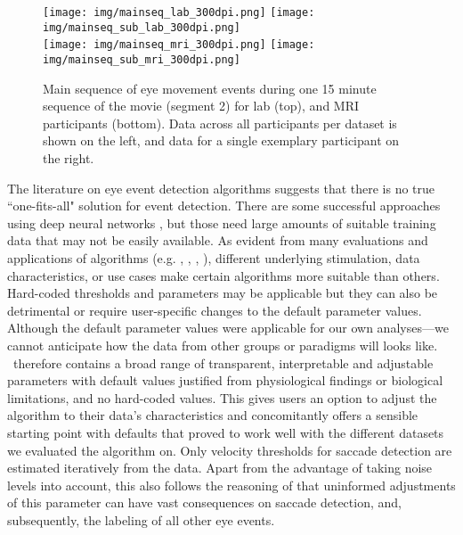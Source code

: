 \begin{figure*}[tbp]
  \texttt{[image: img/mainseq\_lab\_300dpi.png]}
  \texttt{[image: img/mainseq\_sub\_lab\_300dpi.png]} \\
  \texttt{[image: img/mainseq\_mri\_300dpi.png]}
  \texttt{[image: img/mainseq\_sub\_mri\_300dpi.png]}

  \caption{Main sequence of eye movement events during one 15 minute sequence of
  the movie (segment 2) for lab (top), and MRI participants (bottom). Data
  across all participants per dataset is shown on the left, and data for a single
  exemplary participant on the right.}

  \label{fig:overallComp}
\end{figure*}


The literature on eye event detection algorithms suggests that there is no true
``one-fits-all" solution for event detection.  There are some successful
approaches using deep neural networks \citep{Startsev2018}, but those need large amounts of suitable training data that may not be easily
available.
As evident from many evaluations and applications of algorithms (e.g.
\cite{Andersson2017}, \cite{Larsson2013}, \cite{Zemblys2018}, \cite{5523936}),
different underlying stimulation, data characteristics, or use cases make
certain algorithms more suitable than others. Hard-coded thresholds and
parameters may be applicable but they can also be detrimental or require user-specific changes to
the default parameter values. Although the default parameter
values were applicable for our own analyses---we cannot anticipate how the data from other
groups or paradigms will looks like.  \remodnav\ therefore contains a broad range of
transparent, interpretable and adjustable parameters with default values
justified from physiological findings or biological limitations, and no
hard-coded values. This gives users an option to adjust the algorithm to their
data's characteristics and concomitantly offers a sensible starting point with defaults that
proved to work well with the different datasets we evaluated the algorithm on.
Only velocity thresholds for saccade detection are estimated iteratively from
the data. Apart from the advantage of taking noise levels into account, this
also follows the reasoning of \cite{Nystrom2010AnData} that uninformed
adjustments of this parameter can have vast consequences on saccade detection,
and, subsequently, the labeling of all other eye events.


